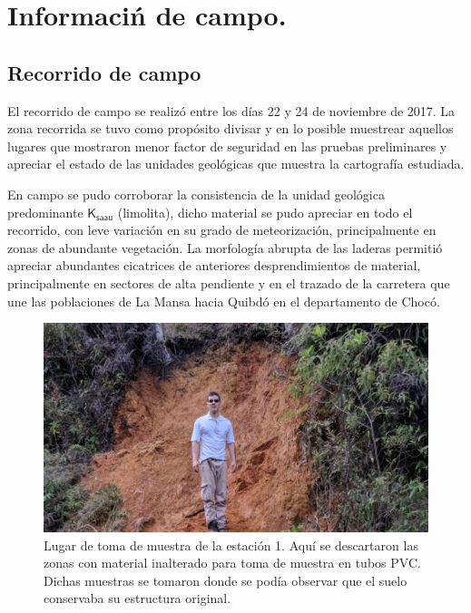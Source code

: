 \usepackage{graphicx}
\usepackage{amsmath}

\chapter{Informaci\'n de campo.}

\section{Recorrido de campo}

El recorrido de campo se realiz\'o entre los d\'ias 22 y 24 de noviembre de 2017. La zona recorrida se tuvo como prop\'osito divisar y en lo posible muestrear aquellos lugares que mostraron menor factor de seguridad en las pruebas preliminares y apreciar el estado de las unidades geol\'ogicas que muestra la cartograf\'ia estudiada.

En campo se pudo corroborar la consistencia de la unidad geol\'ogica predominante \(\mathsf{K_{saau}}\) (limolita), dicho material se pudo apreciar en todo el recorrido, con leve variaci\'on en su grado de meteorizaci\'on, principalmente en zonas de abundante vegetaci\'on. La morfolog\'ia abrupta de las laderas permiti\'o apreciar abundantes cicatrices de anteriores desprendimientos de material, principalmente en sectores de alta pendiente y en el trazado de la carretera que une las poblaciones de La Mansa hacia Quibd\'o en el departamento de Choc\'o.

\begin{figure}[H]
  \centering
  \includegraphics[scale=0.75]{img/estacion10.jpg}
  \caption{Lugar de toma de muestra de la estaci\'on 1. Aqu\'i se descartaron las zonas con material inalterado para toma de muestra en tubos PVC. Dichas muestras se tomaron donde se pod\'ia observar que el suelo conservaba su estructura original. }
  \label{fig:afloramiento}
\end{figure}


